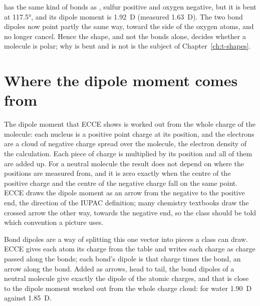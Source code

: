 has the same kind of bonds as , sulfur positive and oxygen negative, but it is bent at \ang{117.5}, and its dipole moment is 1.92~D (measured 1.63~D). The two bond dipoles now point partly the same way, toward the side of the oxygen atoms, and no longer cancel. Hence the shape, and not the bonds alone, decides whether a molecule is polar; why  is bent and  is not is the subject of Chapter~\ref{ch:t-shapes}.

\section{Where the dipole moment comes from}
The dipole moment that ECCE shows is worked out from the whole charge of the molecule: each nucleus is a positive point charge at its position, and the electrons are a cloud of negative charge spread over the molecule, the electron density of the calculation. Each piece of charge is multiplied by its position and all of them are added up. For a neutral molecule the result does not depend on where the positions are measured from, and it is zero exactly when the centre of the positive charge and the centre of the negative charge fall on the same point. ECCE draws the dipole moment as an arrow from the negative to the positive end, the direction of the IUPAC definition; many chemistry textbooks draw the crossed arrow the other way, towards the negative end, so the class should be told which convention a picture uses.

Bond dipoles are a way of splitting this one vector into pieces a class can draw. ECCE gives each atom its charge from the table and writes each charge as charge passed along the bonds; each bond's dipole is that charge times the bond, an arrow along the bond. Added as arrows, head to tail, the bond dipoles of a neutral molecule give exactly the dipole of the atomic charges, and that is close to the dipole moment worked out from the whole charge cloud: for water 1.90~D against 1.85~D.

